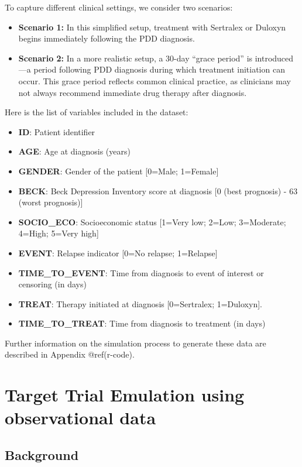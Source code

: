 \documentclass[
]{book}
\begin{document}
To capture different clinical settings, we consider two scenarios:

\begin{itemize}
\item
  \textbf{Scenario 1:} In this simplified setup, treatment with
  Sertralex or Duloxyn begins immediately following the PDD diagnosis.
\item
  \textbf{Scenario 2:} In a more realistic setup, a 30-day ``grace
  period'' is introduced---a period following PDD diagnosis during which
  treatment initiation can occur. This grace period reflects common
  clinical practice, as clinicians may not always recommend immediate
  drug therapy after diagnosis.
\end{itemize}

Here is the list of variables included in the dataset:

\begin{itemize}
\item
  \textbf{ID}: Patient identifier
\item
  \textbf{AGE}: Age at diagnosis (years)
\item
  \textbf{GENDER}: Gender of the patient {[}0=Male; 1=Female{]}
\item
  \textbf{BECK}: Beck Depression Inventory score at diagnosis {[}0 (best
  prognosis) - 63 (worst prognosis){]}
\item
  \textbf{SOCIO\_ECO}: Socioeconomic status {[}1=Very low; 2=Low;
  3=Moderate; 4=High; 5=Very high{]}
\item
  \textbf{EVENT}: Relapse indicator {[}0=No relapse; 1=Relapse{]}
\item
  \textbf{TIME\_TO\_EVENT}: Time from diagnosis to event of interest or
  censoring (in days)
\item
  \textbf{TREAT}: Therapy initiated at diagnosis {[}0=Sertralex;
  1=Duloxyn{]}.
\item
  \textbf{TIME\_TO\_TREAT}: Time from diagnosis to treatment (in days)
\end{itemize}

Further information on the simulation process to generate these data are
described in Appendix @ref(r-code).

\chapter{Target Trial Emulation using observational
data}\label{target-trial-emulation}

\section{Background}\label{background}
\end{document}

